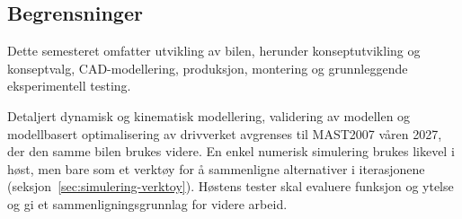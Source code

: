 \subsection{Begrensninger}
Dette semesteret omfatter utvikling av bilen, herunder konseptutvikling og konseptvalg, CAD-modellering, produksjon, montering og grunnleggende eksperimentell testing.

Detaljert dynamisk og kinematisk modellering, validering av modellen og modellbasert optimalisering av drivverket avgrenses til MAST2007 våren 2027, der den samme bilen brukes videre. En enkel numerisk simulering brukes likevel i høst, men bare som et verktøy for å sammenligne alternativer i iterasjonene (seksjon~\ref{sec:simulering-verktoy}). Høstens tester skal evaluere funksjon og ytelse og gi et sammenligningsgrunnlag for videre arbeid.
